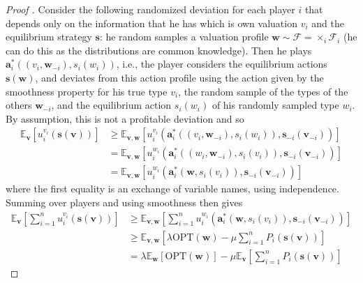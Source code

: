 \begin{proof}[Proof \cite{Syrgkanis2013Composable}]
  Consider the following randomized deviation for each player $ i $ that depends only on the information that he has which is own valuation $ v_i $ and the equilibrium strategy $ \mathbf{s} $: he random samples a valuation profile $ \mathbf{w} \sim \mathcal{F} = \times_i \mathcal{F}_i $ (he can do this as the distributions are common knowledge). Then he plays $ \mathbf{a}_i^{*}((v_i, \mathbf{w}_{-i}), s_i(w_i)) $, i.e., the player considers the equilibrium actions $ \mathbf{s}(\mathbf{w}) $, and deviates from this action profile using the action given by the smoothness property for his true type $ v_i $, the random sample of the types of the others $ \mathbf{w}_{-i} $, and the equilibrium action $ s_i(w_i) $ of his randomly sampled type $ w_i $. By assumption, this is not a profitable deviation and so
  \begin{align*}
    \mathbb{E}_{\mathbf{v}} \left[ u_i^{v_i}(\mathbf{s}(\mathbf{v})) \right] &\geq \mathbb{E}_{\mathbf{v}, \mathbf{w}} \left[ u_i^{v_i}(\mathbf{a}^{*}_i((v_i, \mathbf{w}_{-i}), s_i(w_i)), \mathbf{s}_{-i}(\mathbf{v}_{-i})) \right] \\
                                                                    &= \mathbb{E}_{\mathbf{v}, \mathbf{w}} \left[ u_i^{w_i}(\mathbf{a}^{*}_i((w_i, \mathbf{w}_{-i}), s_i(v_i)), \mathbf{s}_{-i}(\mathbf{v}_{-i})) \right] \\
                                                                    &= \mathbb{E}_{\mathbf{v}, \mathbf{w}} \left[ u_i^{w_i}(\mathbf{a}^{*}_{i}(\mathbf{w}, s_i(v_i)), \mathbf{s}_{-i}(\mathbf{v}_{-i})) \right]
  \end{align*}
  where the first equality is an exchange of variable names, using independence. Summing over players and using smoothness then gives
  \begin{align*}
    \mathbb{E}_{\mathbf{v}} \left[ \sum_{i = 1}^{n}  u_i^{v_i}(\mathbf{s}(\mathbf{v})) \right] &\geq \mathbb{E}_{\mathbf{v}, \mathbf{w}} \left[ \sum_{i = 1}^{n} u_i^{w_i}(\mathbf{a}^{*}_{i}(\mathbf{w}, s_i(v_i)), \mathbf{s}_{-i}(\mathbf{v}_{-i})) \right] \\
                                                                                                 &\geq \mathbb{E}_{\mathbf{v}, \mathbf{w}} \left[ \lambda\text{OPT}(\mathbf{w}) - \mu \sum_{i = 1}^{n} P_i(\mathbf{s}(\mathbf{v})) \right] \\
                                                                                                                                                                    &= \lambda \mathbb{E}_{\mathbf{w}} \left[ \text{OPT}(\mathbf{w}) \right] - \mu \mathbb{E}_{\mathbf{v}}\left[ \sum_{i = 1}^{n} P_i(\mathbf{s}(\mathbf{v})) \right]

\end{align*}
\end{proof}
